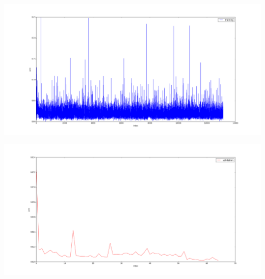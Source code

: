 \documentclass[a4paper]{article}
\begin{document}
\begin{minipage}{0.45\textwidth}
\includegraphics[width=\textwidth]{../pics/command_input_nonaugmented_training.png}
\end{minipage}
\begin{minipage}{0.45\textwidth}
\includegraphics[width=\textwidth]{../pics/command_input_nonaugmented_validation.png}
\end{minipage}
\end{document}
